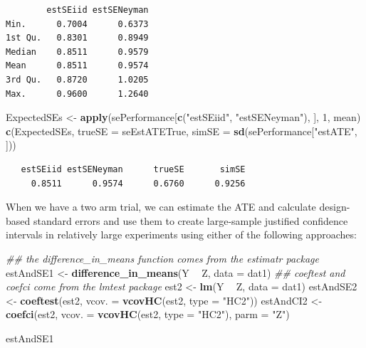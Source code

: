 \documentclass[
  12pt,
]{book}
\newenvironment{Shaded}{\begin{snugshade}}{\end{snugshade}}
\newcommand{\CommentTok}[1]{\textcolor[rgb]{0.56,0.35,0.01}{\textit{#1}}}
\newcommand{\DataTypeTok}[1]{\textcolor[rgb]{0.13,0.29,0.53}{#1}}
\newcommand{\DecValTok}[1]{\textcolor[rgb]{0.00,0.00,0.81}{#1}}
\newcommand{\KeywordTok}[1]{\textcolor[rgb]{0.13,0.29,0.53}{\textbf{#1}}}
\newcommand{\NormalTok}[1]{#1}
\newcommand{\OperatorTok}[1]{\textcolor[rgb]{0.81,0.36,0.00}{\textbf{#1}}}
\newcommand{\StringTok}[1]{\textcolor[rgb]{0.31,0.60,0.02}{#1}}
\theoremstyle{definition}
\theoremstyle{definition}
\theoremstyle{definition}
\theoremstyle{remark}
\begin{document}
\begin{verbatim}
        estSEiid estSENeyman
Min.      0.7004      0.6373
1st Qu.   0.8301      0.8949
Median    0.8511      0.9579
Mean      0.8511      0.9574
3rd Qu.   0.8720      1.0205
Max.      0.9600      1.2640
\end{verbatim}

\begin{Shaded}
\begin{Highlighting}[]
\NormalTok{ExpectedSEs <-}\StringTok{ }\KeywordTok{apply}\NormalTok{(sePerformance[}\KeywordTok{c}\NormalTok{(}\StringTok{"estSEiid"}\NormalTok{, }\StringTok{"estSENeyman"}\NormalTok{), ], }\DecValTok{1}\NormalTok{, mean)}
\KeywordTok{c}\NormalTok{(ExpectedSEs, }\DataTypeTok{trueSE =}\NormalTok{ seEstATETrue, }\DataTypeTok{simSE =} \KeywordTok{sd}\NormalTok{(sePerformance[}\StringTok{"estATE"}\NormalTok{, ]))}
\end{Highlighting}
\end{Shaded}

\begin{verbatim}
   estSEiid estSENeyman      trueSE       simSE 
     0.8511      0.9574      0.6760      0.9256 
\end{verbatim}

When we have a two arm trial, we can estimate the ATE and calculate
design-based standard errors and use them to create large-sample
justified confidence intervals in relatively large experiments using
either of the following approaches:

\begin{Shaded}
\begin{Highlighting}[]
\CommentTok{## the difference_in_means function comes from the estimatr package}
\NormalTok{estAndSE1 <-}\StringTok{ }\KeywordTok{difference_in_means}\NormalTok{(Y }\OperatorTok{~}\StringTok{ }\NormalTok{Z, }\DataTypeTok{data =}\NormalTok{ dat1)}
\CommentTok{## coeftest and coefci come from the lmtest package}
\NormalTok{est2 <-}\StringTok{ }\KeywordTok{lm}\NormalTok{(Y }\OperatorTok{~}\StringTok{ }\NormalTok{Z, }\DataTypeTok{data =}\NormalTok{ dat1)}
\NormalTok{estAndSE2 <-}\StringTok{ }\KeywordTok{coeftest}\NormalTok{(est2, }\DataTypeTok{vcov. =} \KeywordTok{vcovHC}\NormalTok{(est2, }\DataTypeTok{type =} \StringTok{"HC2"}\NormalTok{))}
\NormalTok{estAndCI2 <-}\StringTok{ }\KeywordTok{coefci}\NormalTok{(est2, }\DataTypeTok{vcov. =} \KeywordTok{vcovHC}\NormalTok{(est2, }\DataTypeTok{type =} \StringTok{"HC2"}\NormalTok{), }\DataTypeTok{parm =} \StringTok{"Z"}\NormalTok{)}

\NormalTok{estAndSE1}
\end{Highlighting}
\end{Shaded}
\end{document}

